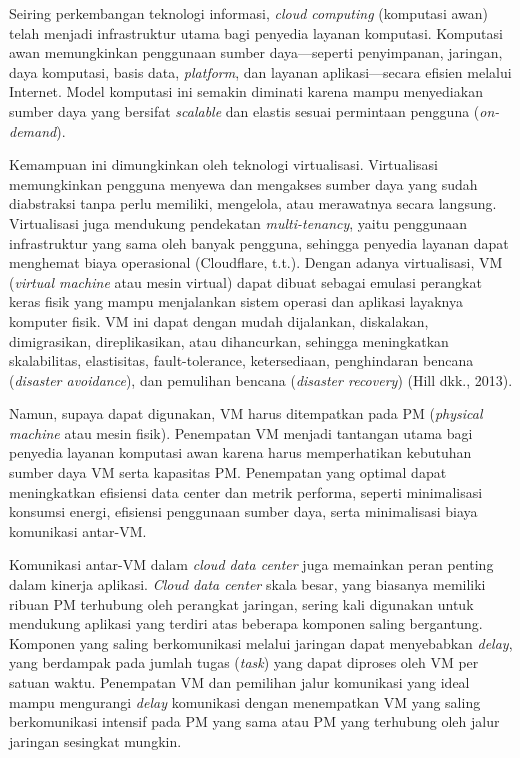 Seiring perkembangan teknologi informasi, \textit{cloud computing} (komputasi awan) telah menjadi infrastruktur utama bagi penyedia layanan komputasi. Komputasi awan memungkinkan penggunaan sumber daya—seperti penyimpanan, jaringan, daya komputasi, basis data, \textit{platform}, dan layanan aplikasi—secara efisien melalui Internet. Model komputasi ini semakin diminati karena mampu menyediakan sumber daya yang bersifat \textit{scalable} dan elastis sesuai permintaan pengguna (\textit{on-demand}).

Kemampuan ini dimungkinkan oleh teknologi virtualisasi. Virtualisasi memungkinkan pengguna menyewa dan mengakses sumber daya yang sudah diabstraksi tanpa perlu memiliki, mengelola, atau merawatnya secara langsung. Virtualisasi juga mendukung pendekatan \textit{multi-tenancy}, yaitu penggunaan infrastruktur yang sama oleh banyak pengguna, sehingga penyedia layanan dapat menghemat biaya operasional (Cloudflare, t.t.). Dengan adanya virtualisasi, VM (\textit{virtual machine} atau mesin virtual) dapat dibuat sebagai emulasi perangkat keras fisik yang mampu menjalankan sistem operasi dan aplikasi layaknya komputer fisik. VM ini dapat dengan mudah dijalankan, diskalakan, dimigrasikan, direplikasikan, atau dihancurkan, sehingga meningkatkan skalabilitas, elastisitas, {fault-tolerance}, ketersediaan, penghindaran bencana (\textit{disaster avoidance}), dan pemulihan bencana (\textit{disaster recovery}) (Hill dkk., 2013).

Namun, supaya dapat digunakan, VM harus ditempatkan pada PM (\textit{physical machine} atau mesin fisik). Penempatan VM menjadi tantangan utama bagi penyedia layanan komputasi awan karena harus memperhatikan kebutuhan sumber daya VM serta kapasitas PM. Penempatan yang optimal dapat meningkatkan efisiensi data center dan metrik performa, seperti minimalisasi konsumsi energi, efisiensi penggunaan sumber daya, serta minimalisasi biaya komunikasi antar-VM.

Komunikasi antar-VM dalam \textit{cloud data center} juga memainkan peran penting dalam kinerja aplikasi. \textit{Cloud data center} skala besar, yang biasanya memiliki ribuan PM terhubung oleh perangkat jaringan, sering kali digunakan untuk mendukung aplikasi yang terdiri atas beberapa komponen saling bergantung. Komponen yang saling berkomunikasi melalui jaringan dapat menyebabkan \textit{delay}, yang berdampak pada jumlah tugas (\textit{task}) yang dapat diproses oleh VM per satuan waktu. Penempatan VM dan pemilihan jalur komunikasi yang ideal mampu mengurangi \textit{delay} komunikasi dengan menempatkan VM yang saling berkomunikasi intensif pada PM yang sama atau PM yang terhubung oleh jalur jaringan sesingkat mungkin. 

